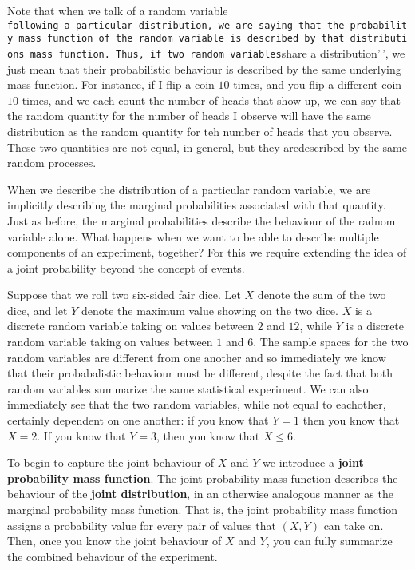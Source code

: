 \documentclass[
  letterpaper,
  DIV=11,
  numbers=noendperiod]{scrreprt}
\begin{document}
Note that when we talk of a random variable
\texttt{following\textquotesingle{}\textquotesingle{}\ a\ particular\ distribution,\ we\ are\ saying\ that\ the\ probability\ mass\ function\ of\ the\ random\ variable\ is\ described\ by\ that\ distribution\textquotesingle{}s\ mass\ function.\ Thus,\ if\ two\ random\ variables}share
a distribution'\,', we just mean that their probabilistic behaviour is
described by the same underlying mass function. For instance, if I flip
a coin \(10\) times, and you flip a different coin \(10\) times, and we
each count the number of heads that show up, we can say that the random
quantity for the number of heads I observe will have the same
distribution as the random quantity for teh number of heads that you
observe. These two quantities are not equal, in general, but they
aredescribed by the same random processes.

When we describe the distribution of a particular random variable, we
are implicitly describing the marginal probabilities associated with
that quantity. Just as before, the marginal probabilities describe the
behaviour of the radnom variable alone. What happens when we want to be
able to describe multiple components of an experiment, together? For
this we require extending the idea of a joint probability beyond the
concept of events.

Suppose that we roll two six-sided fair dice. Let \(X\) denote the sum
of the two dice, and let \(Y\) denote the maximum value showing on the
two dice. \(X\) is a discrete random variable taking on values between
\(2\) and \(12\), while \(Y\) is a discrete random variable taking on
values between \(1\) and \(6\). The sample spaces for the two random
variables are different from one another and so immediately we know that
their probabalistic behaviour must be different, despite the fact that
both random variables summarize the same statistical experiment. We can
also immediately see that the two random variables, while not equal to
eachother, certainly dependent on one another: if you know that \(Y=1\)
then you know that \(X = 2\). If you know that \(Y = 3\), then you know
that \(X \leq 6\).

To begin to capture the joint behaviour of \(X\) and \(Y\) we introduce
a \textbf{joint probability mass function}. The joint probability mass
function describes the behaviour of the \textbf{joint distribution}, in
an otherwise analogous manner as the marginal probability mass function.
That is, the joint probability mass function assigns a probability value
for every pair of values that \((X,Y)\) can take on. Then, once you know
the joint behaviour of \(X\) and \(Y\), you can fully summarize the
combined behaviour of the experiment.
\end{document}
